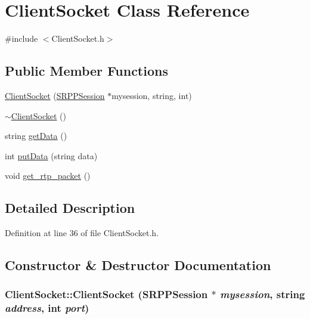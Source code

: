 \hypertarget{class_client_socket}{
\section{ClientSocket Class Reference}
\label{class_client_socket}
}


{\ttfamily \#include $<$ClientSocket.h$>$}

\subsection*{Public Member Functions}
\begin{DoxyCompactItemize}
\item 
\hyperlink{class_client_socket_a742f7351bc8e663c21704c97b56bb4b3}{ClientSocket} (\hyperlink{class_s_r_p_p_session}{SRPPSession} $\ast$mysession, string, int)
\item 
\hyperlink{class_client_socket_aef5d9c1c9b443124b820521276b175ca}{$\sim$ClientSocket} ()
\item 
string \hyperlink{class_client_socket_a0cd1d7163ff77295551111a7ecc9dcbe}{getData} ()
\item 
int \hyperlink{class_client_socket_a4ed02d18f6a81b33c257f2e07d519605}{putData} (string data)
\item 
void \hyperlink{class_client_socket_aa7e55da151341ab75642fc4d14900544}{get\_\-rtp\_\-packet} ()
\end{DoxyCompactItemize}


\subsection{Detailed Description}


Definition at line 36 of file ClientSocket.h.



\subsection{Constructor \& Destructor Documentation}
\hypertarget{class_client_socket_a742f7351bc8e663c21704c97b56bb4b3}{
\subsubsection[{ClientSocket}]{\setlength{\rightskip}{0pt plus 5cm}ClientSocket::ClientSocket ({\bf SRPPSession} $\ast$ {\em mysession}, \/  string {\em address}, \/  int {\em port})}}
\label{class_client_socket_a742f7351bc8e663c21704c97b56bb4b3}


